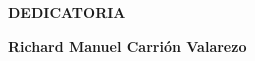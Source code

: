 \newpage
\vspace*{\fill}
\begin{flushright}
  \footnotesize
	\begin{minipage}{0.5\textwidth}
		\begin{flushright}
			\uppercase{\textbf{Dedicatoria}}
		\end{flushright}
		\itshape

		\bigbreak
		\begin{flushright}
			\textbf{Richard Manuel Carrión Valarezo}
		\end{flushright}
	\end{minipage}
\end{flushright}
\vspace*{\fill}
